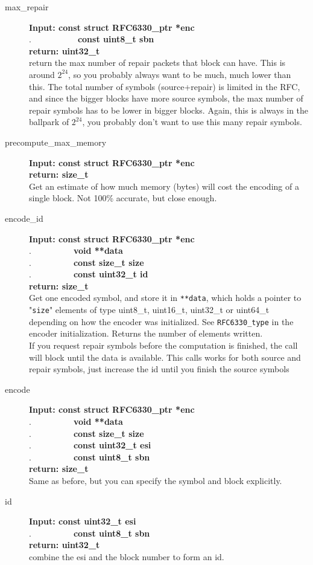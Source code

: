 \documentclass[11pt,a4paper]{refart}
\begin{document}

\begin{description}
\item[max\_repair]\textbf{Input: const struct RFC6330\_ptr *enc}\\
.\ \ \ \ \ \ \ \ \ \ \ \textbf{const uint8\_t sbn}\\
\textbf{return: uint32\_t}\\
return the max number of repair packets that block can have. This is around $2^{24}$, so you probably always want to be much, much lower than this. The total number of symbols (source+repair) is limited in the RFC, and since the bigger blocks have more source symbols, the max number of repair symbols has to be lower in bigger blocks. Again, this is always in the ballpark of $2^{24}$, you probably don't want to use this many repair symbols.
\item[precompute\_max\_memory]\textbf{Input: const struct RFC6330\_ptr *enc}\\
\textbf{return: size\_t}\\
Get an estimate of how much memory (bytes) will cost the encoding of a single block. Not 100\% accurate, but close enough.
\item[encode\_id]\textbf{Input: const struct RFC6330\_ptr *enc}\\
.\ \ \ \ \ \ \ \ \ \ \textbf{void **data}\\
.\ \ \ \ \ \ \ \ \ \ \textbf{const size\_t size}\\
.\ \ \ \ \ \ \ \ \ \ \textbf{const uint32\_t id}\\
\textbf{return: size\_t}\\
Get one encoded symbol, and store it in \texttt{**data}, which holds a pointer to "\texttt{size}" elements of type uint8\_t, uint16\_t, uint32\_t or uint64\_t depending on how the encoder was initialized. See \texttt{RFC6330\_type} in the encoder initialization. Returns the number of elements written.\\
If you request repair symbols before the computation is finished, the call will block until the data is available. This calls works for both source and repair symbols, just increase the id until you finish the source symbols
\item[encode]\textbf{Input: const struct RFC6330\_ptr *enc}\\
.\ \ \ \ \ \ \ \ \ \ \textbf{void **data}\\
.\ \ \ \ \ \ \ \ \ \ \textbf{const size\_t size}\\
.\ \ \ \ \ \ \ \ \ \ \textbf{const uint32\_t esi}\\
.\ \ \ \ \ \ \ \ \ \ \textbf{const uint8\_t sbn}\\
\textbf{return: size\_t}\\
Same as before, but you can specify the symbol and block explicitly.
\item[id]\textbf{Input: const uint32\_t esi}\\
.\ \ \ \ \ \ \ \ \ \ \textbf{const uint8\_t sbn}\\
\textbf{return: uint32\_t}\\
combine the esi and the block number to form an id.
\end{description}
\end{document}
